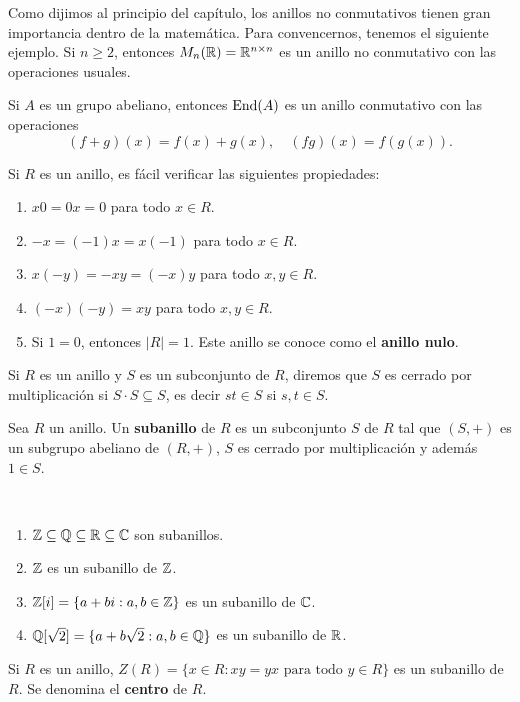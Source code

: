 Como dijimos al principio del capítulo, los anillos no conmutativos tienen gran importancia dentro de la matemática. Para convencernos, 
tenemos el siguiente ejemplo. Si $n\geq2$, entonces 
$M_n(\mathbb{R})=\mathbb{R}^{n\times n}$ es un anillo no conmutativo con las operaciones usuales. 

\begin{exercise}
Si $A$ es un grupo abeliano, entonces $\operatorname{End}(A)$ es un anillo conmutativo con 
las operaciones
\[
(f+g)(x)=f(x)+g(x),\quad
(fg)(x)=f(g(x)).
\]	
\end{exercise}

Si $R$ es un anillo, es fácil verificar las siguientes propiedades:
\begin{enumerate}
	\item $x0=0x=0$ para todo $x\in R$.
	\item $-x=(-1)x=x(-1)$ para todo $x\in R$.
	\item $x(-y)=-xy=(-x)y$ para todo $x,y\in R$.
	\item $(-x)(-y)=xy$ para todo $x,y\in R$.
	\item Si $1=0$, entonces $|R|=1$. Este anillo se conoce como el \textbf{anillo nulo}.
\end{enumerate}

Si $R$ es un anillo y $S$ es un subconjunto de $R$, diremos que 
$S$ es cerrado por multiplicación si $S\cdot S\subseteq S$, 
es decir $st\in S$ si $s,t\in S$. 

\begin{definition}
Sea $R$ un anillo. 
Un \textbf{subanillo} de $R$ es un subconjunto $S$ de $R$ tal que $(S,+)$ es un subgrupo abeliano de $(R,+)$, $S$ es cerrado por multiplicación y además $1\in S$. 
\end{definition}

\begin{examples}\
\begin{enumerate}
\item $\mathbb{Z}\subseteq \mathbb{Q}\subseteq\mathbb{R}\subseteq\mathbb{C}$ son subanillos. 
\item $\mathbb{Z}$ es un subanillo de $\mathbb{Z}$.
\item $\mathbb{Z}[i]=\{a+bi:a,b\in\mathbb{Z}\}$ es un subanillo de $\mathbb{C}$. 
\item $\mathbb{Q}[\sqrt{2}]=\{a+b\sqrt{2}:a,b\in\mathbb{Q}\}$ es un subanillo de $\mathbb{R}$.
\end{enumerate}
\end{examples}

\begin{example}
Si $R$ es un anillo, $Z(R)=\{x\in R:xy=yx\text{ para todo $y\in R$}\}$ es un subanillo de $R$. Se denomina el \textbf{centro} de $R$.
\end{example}

